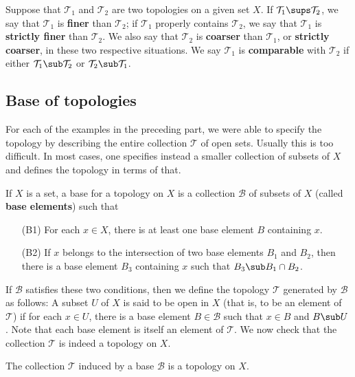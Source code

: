 \begin{definition}
Suppose that $\mathcal{T}_1$ and $\mathcal{T}_2$ are two topologies on a given set $X$. If $\mathcal{T}_1\sups\mathcal{T}_2$, we say that $\mathcal{T}_1$ is \textbf{finer} than $\mathcal{T}_2$; if $\mathcal{T}_1$ properly contains $\mathcal{T}_2$, we say that $\mathcal{T}_1$ is \textbf{strictly finer} than $\mathcal{T}_2$. We also say that $\mathcal{T}_2$ is \textbf{coarser} than $\mathcal{T}_1$, or \textbf{strictly coarser}, in these two respective situations. We say $\mathcal{T}_1$ is \textbf{comparable} with $\mathcal{T}_2$ if either $\mathcal{T}_1\sub\mathcal{T}_2$ or $\mathcal{T}_2\sub\mathcal{T}_1$.
\end{definition}
\subsection{Base of topologies}
For each of the examples in the preceding part, we were able to specify the topology by describing the entire collection $\mathcal{T}$ of open sets. Usually this is too difficult. In most cases, one specifies instead a smaller collection of subsets of $X$ and defines the topology in terms of that.
\begin{definition}
If $X$ is a set, a base for a topology on $X$ is a collection $\mathcal{B}$ of subsets of $X$ (called \textbf{base elements}) such that
\begin{itemize}
\item[(B1)] For each $x\in X$, there is at least one base element $B$ containing $x$.
\item[(B2)] If $x$ belongs to the intersection of two base elements $B_1$ and $B_2$, then there is a base element $B_3$ containing $x$ such that $B_3\sub B_1\cap B_2$.
\end{itemize}
\end{definition}
If $\mathcal{B}$ satisfies these two conditions, then we define the topology $\mathcal{T}$ generated by $\mathcal{B}$ as follows: A subset $U$ of $X$ is said to be open in $X$ (that is, to be an element of $\mathcal{T}$) if for each $x\in U$, there is a base element $B\in\mathcal{B}$ such that $x\in B$ and $B\sub U$. Note that each base element is itself an element of $\mathcal{T}$. We now check that the collection $\mathcal{T}$ is indeed a topology on $X$. 
\begin{proposition}
The collection $\mathcal{T}$ induced by a base $\mathcal{B}$ is a topology on $X$.
\end{proposition}
